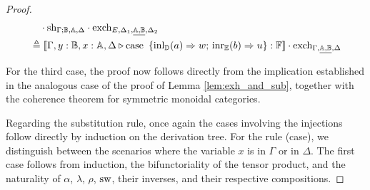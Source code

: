 \documentclass[10pt,a4paper]{amsart}
\theoremstyle{definition}
\theoremstyle{definition}
\theoremstyle{definition}
\theoremstyle{definition}
\theoremstyle{definition}
\theoremstyle{definition}
\begin{document}
\begin{proof}
\begin{align*}
  & \hspace{10pt} \cdot  \text{sh}_{\Gamma; \mathbb{B},\mathbb{A}, \Delta} \cdot  \text{exch}_{E, \Delta_{1},\underline{\mathbb{A},\mathbb{B}},  \Delta_{2}} \\
  & \triangleq [\![\Gamma,y:\mathbb{B}, x:\mathbb{A}, \Delta \triangleright \text{case } \,  \{\text{inl}_{\mathbb{D}} (a) \Rightarrow w ;\, \text{inr}_{\mathbb{E}} (b) \Rightarrow u\}: \mathbb{F}]\!] \cdot \text{exch}_{\Gamma,\underline{\mathbb{A},  \mathbb{B}}, \Delta}
\end{align*}



For the third case, the proof now follows directly from the implication established in the analogous case of the proof of Lemma \ref{lem:exh_and_sub}, together with the coherence theorem for symmetric monoidal categories.

Regarding the substitution rule, once again the cases involving the injections follow directly by induction on the derivation tree. For the rule (case), we distinguish between the scenarios where the variable $x$ is in $\Gamma$ or in $\Delta$. The first case follows from induction, the bifunctoriality of the tensor product, and the naturality of $\alpha$, $\lambda$, $\rho$, $\mathrm{sw}$, their inverses, and their respective compositions.


\end{proof}
\end{document}

